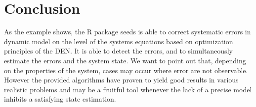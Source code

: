 \section{Conclusion}
As the example shows, the R package \textsf{seeds} is able to correct systematic errors in 
dynamic model on the level of the systems equations based on optimization principles of the 
DEN. It is able to detect the errors, and to simultaneously estimate the errors and the 
system state. We want to point out that, depending on the properties of the system, cases 
may occur where error are not observable. However the provided algorithms have proven to 
yield good results in various realistic problems and may be a fruitful tool whenever the lack of 
a precise model inhibits a satisfying state estimation.